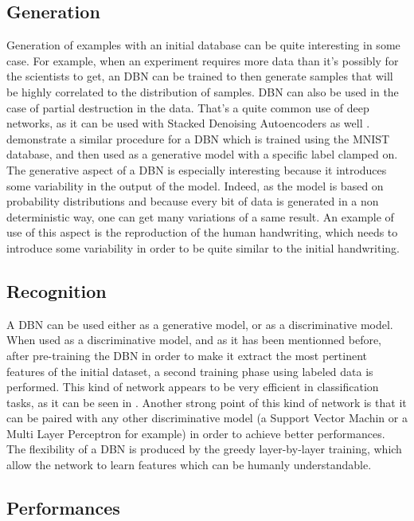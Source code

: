 \documentclass{report}
\begin{document}
	\subsection{Generation}
	
	Generation of examples with an initial database can be quite interesting in 
	some case. For example, when an experiment requires more data than it's 
	possibly for the scientists to get, an DBN can be trained to then generate 
	samples that will be highly correlated to the distribution of samples. DBN can 
	also be used in the case of partial destruction in the data. That's a quite 
	common use of deep networks, as it can be used with Stacked Denoising 
	Autoencoders as well \cite{vincent2010stacked}. 
	\cite{hinton2006fast} demonstrate a similar procedure for a DBN 
	which is trained using the MNIST database, and then used as a generative model 
	with a specific label clamped on. The generative aspect of a DBN is especially 
	interesting because it introduces some variability in the output of the model. 
	Indeed, as the model is based on probability distributions and because every 
	bit of data is generated in a non deterministic way, one can get many 
	variations of a same result. An example of use of this aspect is the 
	reproduction of the human handwriting, which needs to introduce some 
	variability in order to be quite similar to the initial handwriting. 

	\subsection{Recognition}
	
	A DBN can be used either as a generative model, or as a discriminative model. 
	When used as a discriminative model, and as it has been mentionned before, 
	after pre-training the DBN in order to make it extract the most pertinent 
	features of the initial dataset, a second training phase using labeled data is 
	performed. This kind of network appears to be very efficient in classification 
	tasks, as it can be seen in \cite{hinton2006fast}. Another strong 
	point of this kind of network is that it can be paired with any other 
	discriminative model (a Support Vector Machin or a Multi Layer Perceptron for 
	example) in order to achieve better performances. The flexibility of a DBN is 
	produced by the greedy layer-by-layer training, which allow the network to 
	learn features which can be humanly understandable.
	
	\subsection{Performances}
	
\end{document}
